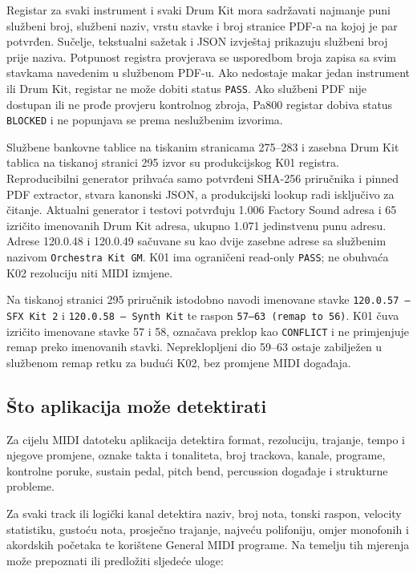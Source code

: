 \documentclass[11pt]{article}
\begin{document}
Registar za svaki instrument i svaki Drum Kit mora sadržavati najmanje puni
službeni broj, službeni naziv, vrstu stavke i broj stranice PDF-a na kojoj je
par potvrđen. Sučelje, tekstualni sažetak i JSON izvještaj prikazuju službeni
broj prije naziva. Potpunost registra provjerava se usporedbom broja zapisa sa
svim stavkama navedenim u službenom PDF-u. Ako nedostaje makar jedan instrument
ili Drum Kit, registar ne može dobiti status \texttt{PASS}. Ako službeni PDF
nije dostupan ili ne prođe provjeru kontrolnog zbroja, Pa800 registar dobiva
status \texttt{BLOCKED} i ne popunjava se prema neslužbenim izvorima.

Službene bankovne tablice na tiskanim stranicama 275--283 i zasebna Drum Kit
tablica na tiskanoj stranici 295 izvor su produkcijskog K01 registra.
Reproducibilni generator prihvaća samo potvrđeni SHA-256 priručnika i pinned
PDF extractor, stvara kanonski JSON, a produkcijski lookup radi isključivo za
čitanje. Aktualni generator i testovi potvrđuju 1.006 Factory Sound adresa i 65
izričito imenovanih Drum Kit adresa, ukupno 1.071 jedinstvenu punu adresu.
Adrese 120.0.48 i 120.0.49 sačuvane su kao dvije zasebne adrese sa službenim
nazivom \texttt{Orchestra Kit GM}. K01 ima ograničeni read-only
\texttt{PASS}; ne obuhvaća K02 rezoluciju niti MIDI izmjene.

Na tiskanoj stranici 295 priručnik istodobno navodi imenovane stavke
\texttt{120.0.57 --- SFX Kit 2} i \texttt{120.0.58 --- Synth Kit} te raspon
\texttt{57--63 (remap to 56)}. K01 čuva izričito imenovane stavke 57 i 58,
označava preklop kao \texttt{CONFLICT} i ne primjenjuje remap preko imenovanih
stavki. Nepreklopljeni dio 59--63 ostaje zabilježen u službenom remap retku za
budući K02, bez promjene MIDI događaja.

\subsection{Što aplikacija može detektirati}

Za cijelu MIDI datoteku aplikacija detektira format, rezoluciju, trajanje,
tempo i njegove promjene, oznake takta i tonaliteta, broj trackova, kanale,
programe, kontrolne poruke, sustain pedal, pitch bend, percussion događaje i
strukturne probleme.

Za svaki track ili logički kanal detektira naziv, broj nota, tonski raspon,
velocity statistiku, gustoću nota, prosječno trajanje, najveću polifoniju,
omjer monofonih i akordskih početaka te korištene General MIDI programe. Na
temelju tih mjerenja može prepoznati ili predložiti sljedeće uloge:
\end{document}
